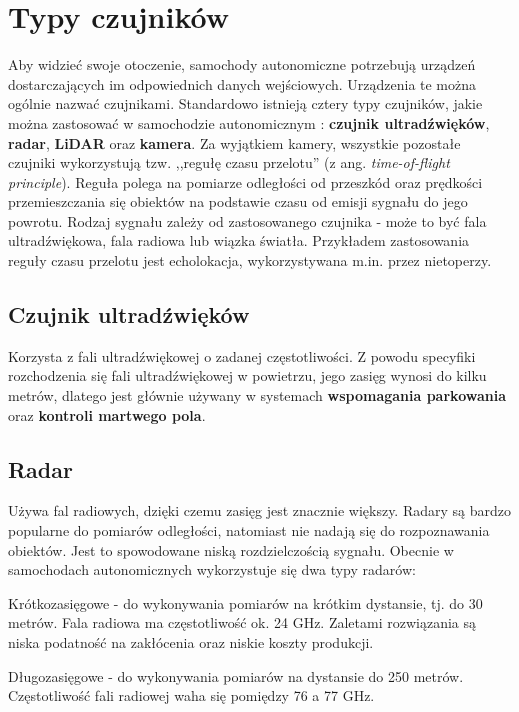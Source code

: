 \section{Typy czujników}
Aby widzieć swoje otoczenie, samochody autonomiczne potrzebują urządzeń dostarczających im odpowiednich danych wejściowych. Urządzenia te można ogólnie nazwać czujnikami. Standardowo istnieją cztery typy czujników, jakie można zastosować w samochodzie autonomicznym \cite{petit:sensorFusion}: \textbf{czujnik ultradźwięków}, \textbf{radar}, \textbf{LiDAR} oraz \textbf{kamera}.
Za wyjątkiem kamery, wszystkie pozostałe czujniki wykorzystują tzw. ,,regułę czasu przelotu'' (z ang. \textit{time-of-flight principle}).
Reguła polega na pomiarze odległości od przeszkód oraz prędkości przemieszczania się obiektów na podstawie czasu od emisji sygnału do jego powrotu. Rodzaj sygnału zależy od zastosowanego czujnika - może to być fala ultradźwiękowa, fala radiowa lub wiązka światła. Przykładem zastosowania reguły czasu przelotu jest echolokacja, wykorzystywana m.in. przez nietoperzy.

\subsection{Czujnik ultradźwięków}
Korzysta z fali ultradźwiękowej o zadanej częstotliwości. Z powodu specyfiki rozchodzenia się fali ultradźwiękowej w powietrzu, jego zasięg wynosi do kilku metrów, dlatego jest głównie używany w systemach \textbf{wspomagania parkowania} oraz \textbf{kontroli martwego pola}.

\subsection{Radar}
Używa fal radiowych, dzięki czemu zasięg jest znacznie większy. Radary są bardzo popularne do pomiarów odległości, natomiast nie nadają się do rozpoznawania obiektów. Jest to spowodowane niską rozdzielczością sygnału. Obecnie w samochodach autonomicznych wykorzystuje się dwa typy radarów:
\begin{enumerate*}
\vspace{-0.5cm}
\item Krótkozasięgowe - do wykonywania pomiarów na krótkim dystansie, tj. do 30 metrów. Fala radiowa ma częstotliwość ok. 24 GHz. Zaletami rozwiązania są niska podatność na zakłócenia oraz niskie koszty produkcji.
\item Długozasięgowe - do wykonywania pomiarów na dystansie do 250 metrów. Częstotliwość fali radiowej waha się pomiędzy 76 a 77 GHz. 
\end{enumerate*}


